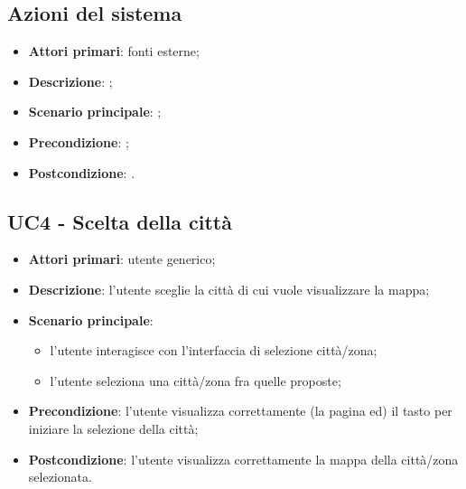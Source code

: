 \subsection{Azioni del sistema}
\begin{itemize}
\item \textbf{Attori primari}: fonti esterne;
\item \textbf{Descrizione}: ;
\item \textbf{Scenario principale}: ;
\item \textbf{Precondizione}: ;
\item \textbf{Postcondizione}: .
\end{itemize}

\subsection{UC4 - Scelta della città}
\begin{itemize}
\item \textbf{Attori primari}: utente generico;
\item \textbf{Descrizione}: l’utente sceglie la città di cui vuole visualizzare la mappa;
\item \textbf{Scenario principale}:
	\begin{itemize}
		\item l’utente interagisce con l’interfaccia di selezione città/zona;
		\item l’utente seleziona una città/zona fra quelle proposte;
	\end{itemize}
\item \textbf{Precondizione}: l’utente visualizza correttamente (la pagina ed) il tasto per iniziare la selezione della città;
\item \textbf{Postcondizione}:  l’utente visualizza correttamente la mappa della città/zona selezionata.
\end{itemize}

